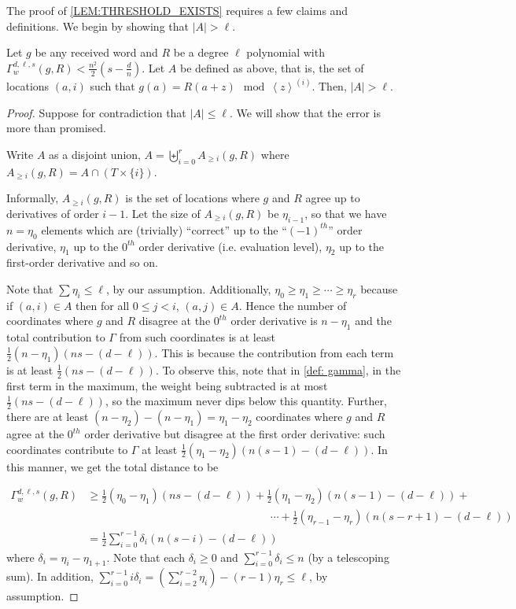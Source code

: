 \documentclass{theoretics}
\def\abs#1{\left| #1 \right|}
\newcommand{\ip}[1]{\left\langle #1 \right\rangle}
\begin{document}
	The proof of \cref{LEM:THRESHOLD_EXISTS} requires a few claims and
	definitions. We begin by showing that $|A|>\ell$.
	
	\begin{claim} \label{clm: size of A}
		Let $g$ be any received word and $R$ be a degree $\ell$ polynomial with $\Gamma_w^{d, \ell, s} (g, R) < \frac{n^2}{2}(s-\frac{d}{n})$.  Let $A$ be defined as above, that is, the set of locations $(a,i)$ such
		that $g(a)=R(a+z) \mod \ip{z}^{(i)}$.  Then, $\abs{A} > \ell$. 
	\end{claim}
	
	\begin{proof}
		Suppose for contradiction that $\abs{A} \leq \ell$. We will show that the error is more than promised.
		
		Write $A$ as a disjoint union, $A = \biguplus_{i = 0}^{r} A_{\geq i}(g, R)$ where $A_{\geq i}(g,R)=A\cap (T\times \{i\})$.
		
		Informally, $A_{\geq i}(g, R)$ is the set of locations where $g$ and $R$ agree up to derivatives of order $i-1$. Let the size of $A_{\geq i}(g, R)$ be $\eta_{i-1}$, so that we have $n = \eta_0$ elements which are (trivially) ``correct'' up to the ``$(-1)^{th}$'' order derivative, $\eta_1$ up to the $0^{th}$ order derivative (i.e. evaluation level), $\eta_2$ up to the first-order derivative and so on.
		
		Note that $\sum \eta_i \leq \ell$, by our assumption. 
		Additionally, $\eta_0 \geq \eta_1 \geq \dotsb \geq \eta_{r}$ because if $(a,i) \in A$ then for all $0 \leq j<i$, $(a,j)\in A$.
		Hence the number of coordinates where $g$ and $R$ disagree at the $0^{th}$ order derivative is $n-\eta_1$ and the total contribution to $\Gamma$ from such coordinates is at least $\frac{1}{2}(n-\eta_1)(ns-(d-\ell))$. This is because the contribution from each term is at least $\frac12(ns-(d-\ell))$. To observe this, note that in \cref{def: gamma}, in the first term in the maximum, the weight being subtracted is at most $\frac{1}{2}(ns-(d-\ell))$, so the maximum never dips below this quantity. Further, there are at least  $(n-\eta_2)-(n-\eta_1)=\eta_1-\eta_2$ coordinates where $g$ and $R$ agree at the $0^{th}$ order derivative but disagree at the first order derivative: such coordinates contribute to $\Gamma$ at least $\frac{1}{2}(\eta_1-\eta_2)(n(s-1)-(d-\ell))$. In this manner, we get the total distance to be 
		
		\[  
		\begin{split}
			\Gamma_w^{d, \ell, s} (g, R) & \geq \frac{1}{2}(\eta_0-\eta_1)(ns-(d-\ell)) + \frac{1}{2}(\eta_1-\eta_2)(n(s-1)-(d-\ell)) + \\
			&  \hspace{7cm} \dotsb + \frac{1}{2}(\eta_{r-1}-\eta_{r})(n(s-r+1)-(d-\ell))\\
			& = \frac{1}{2} \sum_{i=0}^{r-1} \delta_i ( n(s-i) - (d-\ell)) 
		\end{split}
		\]
		where $\delta_i = \eta_{i} - \eta_{1+1}$. Note that each $\delta_i \geq 0$ and $\sum_{i=0}^{r-1} \delta_i 
		\leq n$ (by a telescoping sum). In addition, $\sum_{i=0}^{r-1} i \delta_i =  (\sum_{i=2}^{r-2} \eta_i)-(r-1)\eta_{r}  \leq \ell$, by assumption. 
		

\end{proof}
\end{document}
